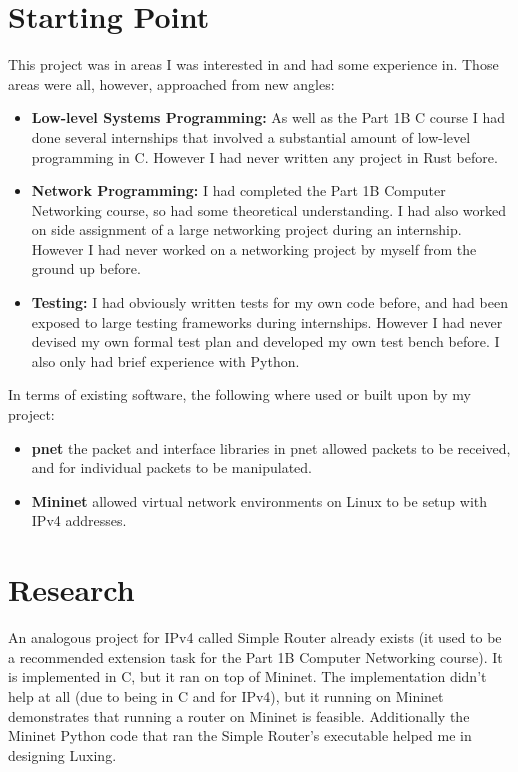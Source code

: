 \documentclass[12pt,a4paper,twoside,openright]{report}
\begin{document}
\section{Starting Point}
This project was in areas I was interested in and had some experience in. Those areas were all, however, approached from new angles:
\begin{itemize}
\item \textbf{Low-level Systems Programming:} As well as the Part 1B C course I had done several internships that involved a substantial amount of low-level programming in C. However I had never written any project in Rust before.
\item \textbf{Network Programming:} I had completed the Part 1B Computer Networking course, so had some theoretical understanding.  I had also worked on side assignment of a large networking project during an internship.  However I had never worked on a networking project by myself from the ground up before.
\item \textbf{Testing:} I had obviously written tests for my own code before, and had been exposed to large testing frameworks during internships.  However I had never devised my own formal test plan and developed my own test bench before. I also only had brief experience with Python.
\end{itemize}
In terms of existing software, the following where used or built upon by my project:
\begin{itemize}
\item \textbf{pnet}\cite{pnet_rust} the packet and interface libraries in pnet allowed packets to be received, and for individual packets to be manipulated.
\item \textbf{Mininet}\cite{mininet} allowed virtual network environments on Linux to be setup with IPv4 addresses.
\end{itemize}

\section{Research}
An analogous project for IPv4 called Simple Router already exists\cite{simple_router} (it used to be a recommended extension task for the Part 1B Computer Networking course).  It is implemented in C, but it ran on top of Mininet.  The implementation didn't help at all (due to being in C and for IPv4), but it running on Mininet demonstrates that running a router on Mininet is feasible.  Additionally the Mininet Python code that ran the Simple Router's executable helped me in designing Luxing.
\end{document}

